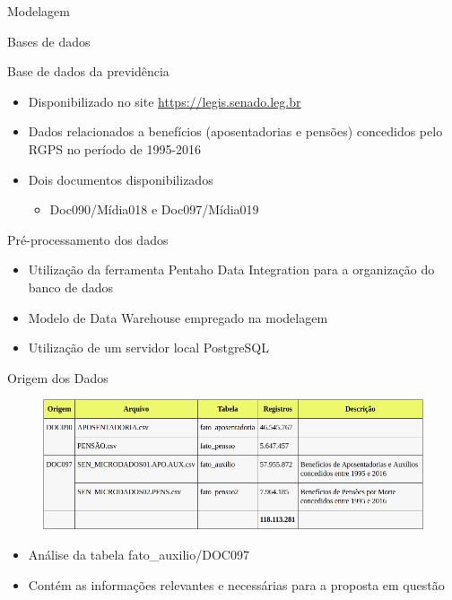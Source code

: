 \begin{frame}
  Modelagem
\end{frame}

\begin{frame}{Bases de dados}
  \begin{block}{Base de dados da previdência}
    \begin{itemize}
      \item Disponibilizado no site \alert{\underline{\url{https://legis.senado.leg.br}}}
      \item Dados relacionados a benefícios (\alert{aposentadorias} e \alert{pensões}) concedidos pelo RGPS no período de 1995-2016
      \item Dois documentos disponibilizados
      \begin{itemize}
        \item Doc090/Mídia018 e Doc097/Mídia019
      \end{itemize}
    \end{itemize}
  \end{block}
    
  \begin{block}{Pré-processamento dos dados}
    \begin{itemize}
      \item Utilização da ferramenta \alert{Pentaho Data Integration} para a organização do banco de dados
      \item Modelo de \alert{Data Warehouse} empregado na modelagem
      \item Utilização de um servidor local PostgreSQL 
    \end{itemize}
  \end{block}
\end{frame}

\begin{frame}{Origem dos Dados}
  \begin{figure}[h]
  	\begin{center}
      \includegraphics [scale=0.48]{./Figures/table1}
  	\end{center}
  \end{figure}
  
  \begin{block}{}
    \begin{itemize}
      \item Análise da tabela \alert{fato\_auxilio/DOC097}
      \item Contém as informações relevantes e necessárias para a proposta em questão
    \end{itemize}
  \end{block}
\end{frame}

